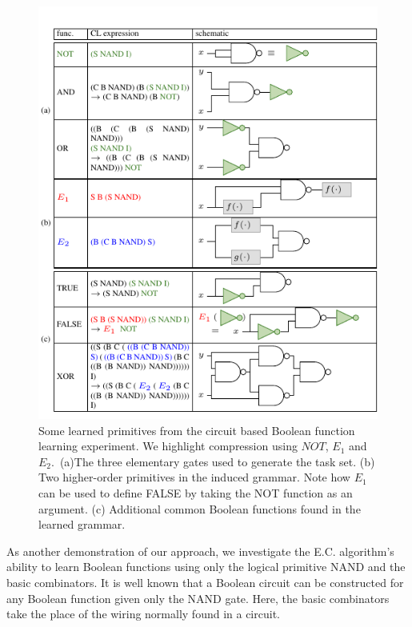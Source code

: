 \documentclass{article}
\begin{document}
\begin{figure}[t]
\includegraphics{./figures/tablealonedoc.pdf}
\caption{Some learned primitives from the circuit based Boolean
  function learning experiment. We highlight compression using $NOT$,
  $E_1$ and $E_2$. \,(a)The three elementary gates used to generate
  the task set. (b) Two higher-order primitives in the induced
  grammar. Note how $E_1$ can be used to define FALSE by taking the
  NOT function as an argument. (c) Additional common Boolean functions
  found in the learned grammar.  \label{table:booleanCircuits}}
\end{figure}



As another demonstration of our approach, we investigate the
E.C. algorithm's ability to learn Boolean functions using only the logical
primitive NAND and the basic combinators. It is well known that a
Boolean circuit can be constructed for any Boolean function given only
the NAND gate. Here, the basic combinators take the place of the
wiring normally found in a circuit.
\end{document}
